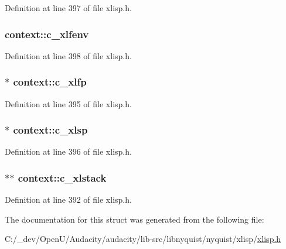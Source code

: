 Definition at line 397 of file xlisp.\+h.

\subsubsection[{\texorpdfstring{c\+\_\+xlfenv}{c_xlfenv}}]{ context\+::c\+\_\+xlfenv}\hypertarget{structcontext_afad0936bb5bd6e551a30f8c95ee86afb}{}\label{structcontext_afad0936bb5bd6e551a30f8c95ee86afb}


Definition at line 398 of file xlisp.\+h.

\subsubsection[{\texorpdfstring{c\+\_\+xlfp}{c_xlfp}}]{$\ast$ context\+::c\+\_\+xlfp}\hypertarget{structcontext_ac75e092bb4459afcf34642cf84bf6e85}{}\label{structcontext_ac75e092bb4459afcf34642cf84bf6e85}


Definition at line 395 of file xlisp.\+h.

\subsubsection[{\texorpdfstring{c\+\_\+xlsp}{c_xlsp}}]{$\ast$ context\+::c\+\_\+xlsp}\hypertarget{structcontext_acfd34b17e765579d2ea5be18ad44a982}{}\label{structcontext_acfd34b17e765579d2ea5be18ad44a982}


Definition at line 396 of file xlisp.\+h.

\subsubsection[{\texorpdfstring{c\+\_\+xlstack}{c_xlstack}}]{$\ast$$\ast$ context\+::c\+\_\+xlstack}\hypertarget{structcontext_ab0cded4b5c36cd31ccc615bd3ef99b96}{}\label{structcontext_ab0cded4b5c36cd31ccc615bd3ef99b96}


Definition at line 392 of file xlisp.\+h.



The documentation for this struct was generated from the following file\+:\begin{DoxyCompactItemize}
\item 
C\+:/\+\_\+dev/\+Open\+U/\+Audacity/audacity/lib-\/src/libnyquist/nyquist/xlisp/\hyperlink{xlisp_8h}{xlisp.\+h}\end{DoxyCompactItemize}
